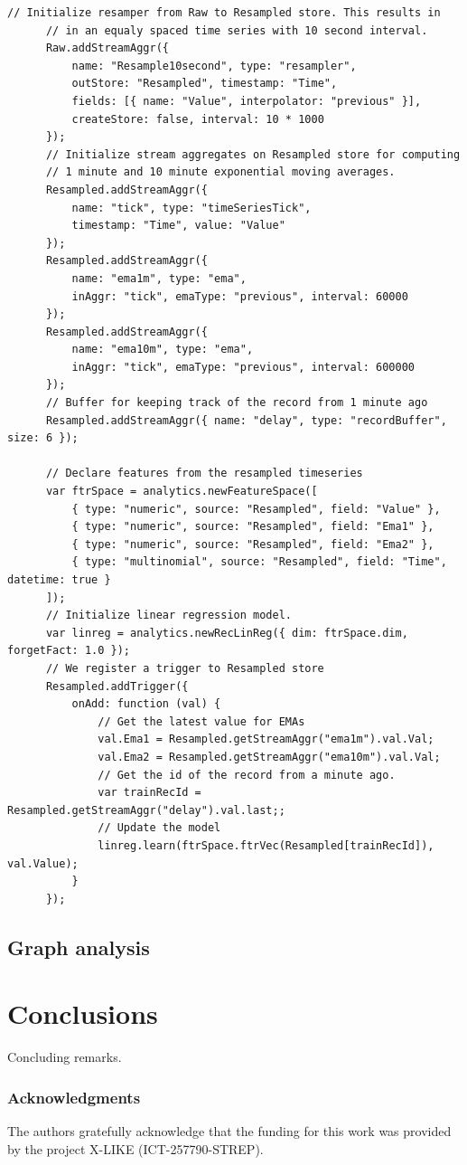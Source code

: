 \documentclass{article} %
\begin{document}
      \begin{lstlisting}[caption=Time series processing] 	
      // Initialize resamper from Raw to Resampled store. This results in
      // in an equaly spaced time series with 10 second interval.
      Raw.addStreamAggr({
          name: "Resample10second", type: "resampler",
          outStore: "Resampled", timestamp: "Time",
          fields: [{ name: "Value", interpolator: "previous" }],
          createStore: false, interval: 10 * 1000
      });
      // Initialize stream aggregates on Resampled store for computing
      // 1 minute and 10 minute exponential moving averages.
      Resampled.addStreamAggr({
          name: "tick", type: "timeSeriesTick",
          timestamp: "Time", value: "Value"
      });
      Resampled.addStreamAggr({
          name: "ema1m", type: "ema",
          inAggr: "tick", emaType: "previous", interval: 60000
      });
      Resampled.addStreamAggr({
          name: "ema10m", type: "ema",
          inAggr: "tick", emaType: "previous", interval: 600000
      });
      // Buffer for keeping track of the record from 1 minute ago
      Resampled.addStreamAggr({ name: "delay", type: "recordBuffer", size: 6 });

      // Declare features from the resampled timeseries
      var ftrSpace = analytics.newFeatureSpace([
          { type: "numeric", source: "Resampled", field: "Value" },
          { type: "numeric", source: "Resampled", field: "Ema1" },
          { type: "numeric", source: "Resampled", field: "Ema2" },
          { type: "multinomial", source: "Resampled", field: "Time", datetime: true }
      ]);
      // Initialize linear regression model.
      var linreg = analytics.newRecLinReg({ dim: ftrSpace.dim, forgetFact: 1.0 });
      // We register a trigger to Resampled store
      Resampled.addTrigger({
          onAdd: function (val) {
              // Get the latest value for EMAs
              val.Ema1 = Resampled.getStreamAggr("ema1m").val.Val;
              val.Ema2 = Resampled.getStreamAggr("ema10m").val.Val;
              // Get the id of the record from a minute ago.
              var trainRecId = Resampled.getStreamAggr("delay").val.last;;
              // Update the model
              linreg.learn(ftrSpace.ftrVec(Resampled[trainRecId]), val.Value);
          }
      });

      \end{lstlisting}

   \subsection{Graph analysis}


\section{Conclusions}
   Concluding remarks.

\subsubsection*{Acknowledgments}
   The authors gratefully acknowledge that the funding for this work was provided by the project X-LIKE (ICT-257790-STREP)\cite{xlike}.




\end{document}
